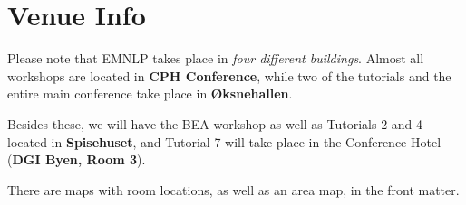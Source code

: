 \setheaders{}{}
\section{Venue Info}{}

Please note that EMNLP takes place in \textit{four different buildings}. Almost all workshops are located in \textbf{CPH Conference}, while two of the tutorials and the entire main conference take place in \textbf{Øksnehallen}. 

Besides these, we will have the BEA workshop as well as Tutorials 2 and 4 located in \textbf{Spisehuset}, and Tutorial 7 will take place in the Conference Hotel (\textbf{DGI Byen, Room 3}).

There are maps with room locations, as well as an area map, in the front matter.